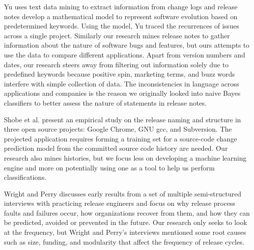 \documentclass{acm_proc_article-sp}
\begin{document}
Yu \cite{YuChangeLogs} uses text data mining to extract information from change logs and release notes develop a mathematical model to represent software evolution based on predetermined keywords. Using the model, Yu traced the recurrences of issues across a single project.
Similarly our research mines release notes to gather information about the nature of software bugs and features, but ours attempts to use the data to compare different applications. 
Apart from version numbers and dates, our research steers away from filtering out information solely due to predefined keywords because positive spin, marketing terms, and buzz words interfere with simple collection of data. 
The inconsistencies in language across applications and companies is the reason we originally looked into naive Bayes classifiers to better assess the nature of statements in release notes.

Shobe et al. \cite{ShobeMapping} present an empirical study on the release naming and structure in three open source projects: Google Chrome, GNU gcc, and Subversion.  
The projected application requires forming a training set for a source-code change prediction model from the committed source code history are needed.
Our research also mines histories, but we focus less on developing a machine learning engine and more on potentially using one as a tool to help us perform classifications.

Wright and Perry \cite{WrightPitfalls} discusses early results from a set of multiple semi-structured interviews with practicing release engineers and focus on why release process faults and failures occur, how organizations recover from them, and how they can be predicted, avoided or prevented in the future.
Our research only seeks to look at the frequency, but Wright and Perry's interviews mentioned some root causes such as size, funding, and modularity that affect the frequency of release cycles.



\end{document}
